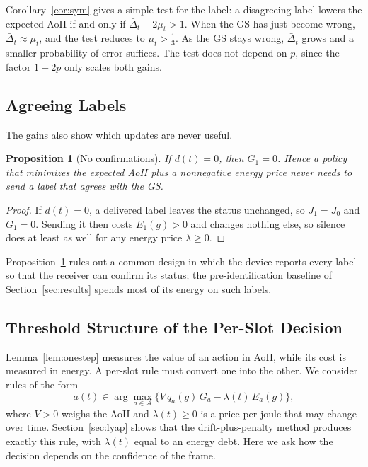 \documentclass[journal]{IEEEtran}
\newtheorem{proposition}{Proposition}
\theoremstyle{remark}
\newcommand{\A}{\mathcal{A}}
\newcommand{\Dbar}{\bar{\Delta}}
\begin{document}
Corollary~\ref{cor:sym} gives a simple test for the label: a disagreeing label lowers the expected AoII if and only if $\Dbar_t+2\mu_t>1$. When the GS has just become wrong, $\Dbar_t\approx\mu_t$, and the test reduces to $\mu_t>\frac13$. As the GS stays wrong, $\Dbar_t$ grows and a smaller probability of error suffices. The test does not depend on $p$, since the factor $1-2p$ only scales both gains.

\subsection{Agreeing Labels}
The gains also show which updates are never useful.

\begin{proposition}[No confirmations]\label{prop:confirm}
If $d(t)=0$, then $G_1=0$. Hence a policy that minimizes the expected AoII plus a nonnegative energy price never needs to send a label that agrees with the GS.
\end{proposition}
\begin{proof}
If $d(t)=0$, a delivered label leaves the status unchanged, so $J_1=J_0$ and $G_1=0$. Sending it then costs $E_1(g)>0$ and changes nothing else, so silence does at least as well for any energy price $\lambda\ge0$.
\end{proof}

Proposition~\ref{prop:confirm} rules out a common design in which the device reports every label so that the receiver can confirm its status; the pre-identification baseline of Section~\ref{sec:results} spends most of its energy on such labels.

\subsection{Threshold Structure of the Per-Slot Decision}
Lemma~\ref{lem:onestep} measures the value of an action in AoII, while its cost is measured in energy. A per-slot rule must convert one into the other. We consider rules of the form
\begin{equation}\label{eq:rule}
a(t)\in\arg\max_{a\in\A}\big\{V\,q_a(g)\,G_a-\lambda(t)\,E_a(g)\big\},
\end{equation}
where $V>0$ weighs the AoII and $\lambda(t)\ge0$ is a price per joule that may change over time. Section~\ref{sec:lyap} shows that the drift-plus-penalty method produces exactly this rule, with $\lambda(t)$ equal to an energy debt. Here we ask how the decision depends on the confidence of the frame.
\end{document}

